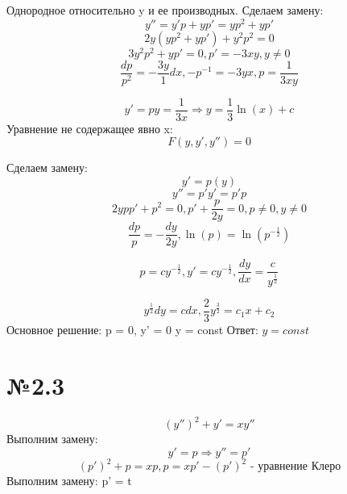 \documentclass{article}
\begin{document}
Однородное относительно y и ее производных.
Сделаем замену:
\begin{equation*}
    y'' = y'p + yp' = yp^2 + yp'
\end{equation*}
\begin{equation*}
    2y(yp^2 + yp') + y^2p^2 = 0
\end{equation*}
\begin{equation*}
    3y^2p^2 + yp' = 0, p' = -3xy, y \ne 0
\end{equation*}
\begin{equation*}
    \frac{dp}{p^2} = -\frac{3y}{1}dx, -p^{-1} = -3yx, p = \frac{1}{3xy}
\end{equation*}

\begin{equation*}
    y' = py = \frac{1}{3x} \Rightarrow y = \frac{1}{3}\ln{(x)} + c
\end{equation*}
Уравнение не содержащее явно x:
\begin{equation*}
    F(y, y', y'') = 0
\end{equation*}

Сделаем замену:
\begin{equation*}
    y' = p(y) 
\end{equation*}
\begin{equation*}
    y'' = p'y' = p'p
\end{equation*}
\begin{equation*}
    2ypp' + p^2 = 0, p' + \frac{p}{2y} = 0, p \ne 0 , y \ne 0
\end{equation*}
\begin{equation*}
    \frac{dp}{p} = -\frac{dy}{2y} , \ln{(p)} = \ln{(p^{-\frac{1}{2}})}
\end{equation*}

\begin{equation*}
    p = c y^{-\frac{1}{2}}, y' = cy^{-\frac{1}{2}}, \frac{dy}{dx} = \frac{c}{y^{\frac{1}{2}}}
\end{equation*}

\begin{equation*}
    y^{\frac{1}{2}}dy = cdx, \frac{2}{3}y^{\frac{3}{2}} = c_1x + c_2
\end{equation*}
Основное решение:
p = 0, y' = 0 \Rightarrow y = const
Ответ: $ y = const$

\section*{№2.3}
\begin{equation*}
    (y'')^2 + y' = xy''
\end{equation*}
Выполним замену:
\begin{equation*}
    y' = p \Rightarrow y'' = p'
\end{equation*}
\begin{equation*}
    (p')^2 + p = xp, p = xp' - (p')^2 \text{ - уравнение Клеро}
\end{equation*}
Выполним замену: p' = t
\end{document}
